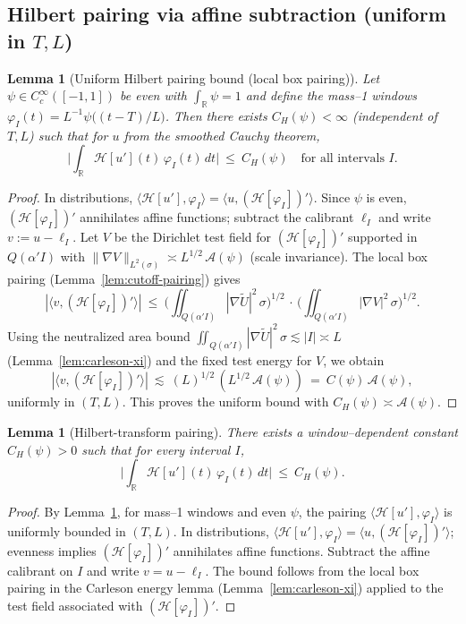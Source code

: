 \documentclass[11pt]{article}
\newtheorem{lemma}[theorem]{Lemma}
\theoremstyle{definition}
\theoremstyle{remark}
\newcommand{\R}{\mathbb{R}}
\begin{document}
\subsection*{Hilbert pairing via affine subtraction (uniform in $T,L$)}
\begin{lemma}[Uniform Hilbert pairing bound (local box pairing)]\label{lem:hilbert-H1BMO}
Let $\psi\in C_c^\infty([-1,1])$ be even with $\int_\R\psi=1$ and define the mass--1 windows $\varphi_I(t)=L^{-1}\psi\big((t-T)/L\big)$. Then there exists $C_H(\psi)<\infty$ (independent of $T,L$) such that for $u$ from the smoothed Cauchy theorem,
\[
  \Big|\int_\R \mathcal H[u'](t)\,\varphi_I(t)\,dt\Big|\ \le\ C_H(\psi)\quad\text{for all intervals }I.
\]
\end{lemma}
\begin{proof}
In distributions, $\langle \mathcal H[u'],\varphi_I\rangle=\langle u,(\mathcal H[\varphi_I])'\rangle$. Since $\psi$ is even, $(\mathcal H[\varphi_I])'$ annihilates affine functions; subtract the calibrant $\ell_I$ and write $v:=u-\ell_I$. Let $V$ be the Dirichlet test field for $(\mathcal H[\varphi_I])'$ supported in $Q(\alpha'I)$ with $\|\nabla V\|_{L^2(\sigma)}\asymp L^{1/2}\,\mathcal A(\psi)$ (scale invariance). The local box pairing (Lemma~\ref{lem:cutoff-pairing}) gives
\[
  |\langle v,(\mathcal H[\varphi_I])'\rangle|\ \le\ \Big(\iint_{Q(\alpha'I)} |\nabla \widetilde U|^2\,\sigma\Big)^{1/2}\,\cdot\,\Big(\iint_{Q(\alpha'I)} |\nabla V|^2\,\sigma\Big)^{1/2}.
\]
Using the neutralized area bound $\iint_{Q(\alpha'I)} |\nabla \widetilde U|^2\,\sigma\lesssim |I|\asymp L$ (Lemma~\ref{lem:carleson-xi}) and the fixed test energy for $V$, we obtain
\[
  |\langle v,(\mathcal H[\varphi_I])'\rangle|\ \lesssim\ (L)^{1/2}\,(L^{1/2}\,\mathcal A(\psi))\ =\ C(\psi)\,\mathcal A(\psi),
\]
uniformly in $(T,L)$. This proves the uniform bound with $C_H(\psi)\asymp \mathcal A(\psi)$.
\end{proof}
\begin{lemma}[Hilbert-transform pairing]\label{lem:hilbert}
There exists a window–dependent constant \(C_H(\psi)>0\) such that for every interval \(I\),
\[ \Big|\int_{\R} \mathcal H[u'](t)\,\varphi_I(t)\,dt\Big|\ \le\ C_H(\psi).\]
\end{lemma}
\begin{proof}
By Lemma~\ref{lem:hilbert-H1BMO}, for mass–1 windows and even \(\psi\), the pairing \(\langle \mathcal H[u'],\varphi_I\rangle\) is uniformly bounded in \((T,L)\). In distributions, \(\langle \mathcal H[u'],\varphi_I\rangle=\langle u,(\mathcal H[\varphi_I])'\rangle\); evenness implies \((\mathcal H[\varphi_I])'\) annihilates affine functions. Subtract the affine calibrant on \(I\) and write \(v=u-\ell_I\). The bound follows from the local box pairing in the Carleson energy lemma (Lemma~\ref{lem:carleson-xi}) applied to the test field associated with \((\mathcal H[\varphi_I])'\).
\end{proof}
\end{document}
